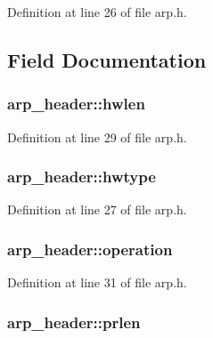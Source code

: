 Definition at line 26 of file arp.\+h.



\subsection{Field Documentation}
\hypertarget{structarp__header_ad11b0f96095d8f44e6b21aaa3938df1f}{
\subsubsection[{hwlen}]{ arp\+\_\+header\+::hwlen}}\label{structarp__header_ad11b0f96095d8f44e6b21aaa3938df1f}


Definition at line 29 of file arp.\+h.

\hypertarget{structarp__header_a571cbbe11fab087a17240660f28c19b9}{
\subsubsection[{hwtype}]{ arp\+\_\+header\+::hwtype}}\label{structarp__header_a571cbbe11fab087a17240660f28c19b9}


Definition at line 27 of file arp.\+h.

\hypertarget{structarp__header_a115cbc3f70bdcb71f36ed74a02ce585f}{
\subsubsection[{operation}]{ arp\+\_\+header\+::operation}}\label{structarp__header_a115cbc3f70bdcb71f36ed74a02ce585f}


Definition at line 31 of file arp.\+h.

\hypertarget{structarp__header_a9188068c8427afd6f989e98e37a6c9ce}{
\subsubsection[{prlen}]{ arp\+\_\+header\+::prlen}}\label{structarp__header_a9188068c8427afd6f989e98e37a6c9ce}


